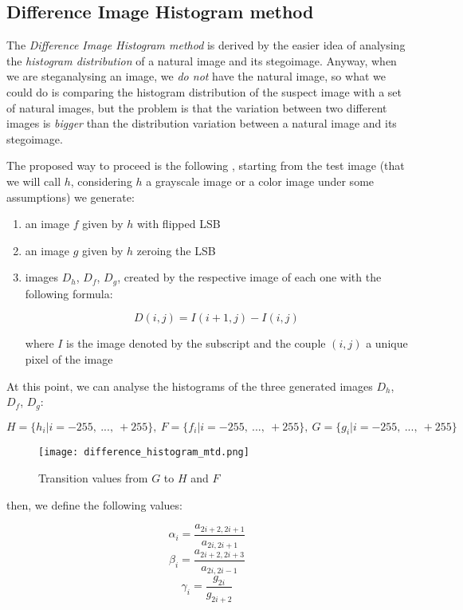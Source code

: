 \documentclass[../../main.tex]{subfiles}
\begin{document}
\subsection{Difference Image Histogram method}
The \emph{Difference Image Histogram method} is derived by the easier idea
of analysing the \emph{histogram distribution} of a natural image and its
stegoimage. Anyway, when we are steganalysing an image, we \emph{do not}
have the natural image, so what we could do is comparing the histogram
distribution of the suspect image with a set of natural images, but the
problem is that the variation between two different images is \emph{bigger}
than the distribution variation between a natural image and its stegoimage.
\cite{methodology-steganalysis-images}

The proposed way to proceed is the following
\cite{new-detection-lsb-steganography}, starting from the test image (that
we will call $h$, considering $h$ a grayscale image or a color image under
some assumptions) we generate:
\begin{enumerate}
    \item an image $f$ given by $h$ with flipped LSB
    \item an image $g$ given by $h$ zeroing the LSB
    \item images $D_h$, $D_f$, $D_g$, created by the respective image of
          each one with the following formula:

          \[ D(i,j) = I(i+1,j) - I(i,j) \]

          where $I$ is the image denoted by the subscript and the couple
          $(i,j)$ a unique pixel of the image
\end{enumerate}

At this point, we can analyse the histograms of the three generated images
$D_h$, $D_f$, $D_g$:

\[
    H = \{h_i | i = -255,\ ...,\ +255\},\ 
    F = \{f_i | i = -255,\ ...,\ +255\},\ 
    G = \{g_i | i = -255,\ ...,\ +255\}
\]

\begin{figure}[h]
    \centering
    \caption{Transition values from $G$ to $H$ and $F$}
    \texttt{[image: difference\_histogram\_mtd.png]}
\end{figure}

then, we define the following values:

\[ \alpha_i = \frac{a_{2i+2,2i+1}}{a_{2i,2i+1}} \]
\[ \beta_i = \frac{a_{2i+2,2i+3}}{a_{2i,2i-1}} \]
\[ \gamma_i = \frac{g_{2i}}{g_{2i+2}} \]
\end{document}
